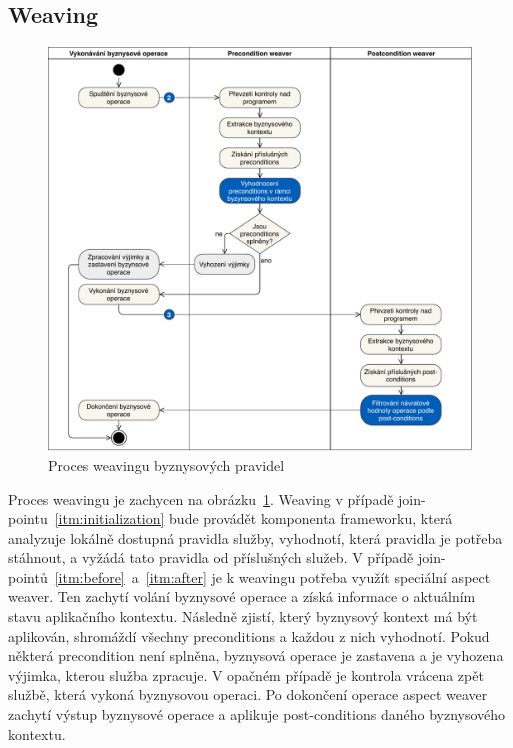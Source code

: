 \subsection{Weaving}

\begin{figure}
    \centering
    \includegraphics[keepaspectratio=true, width=0.9\linewidth]{figures/business-rules-weaver.pdf}
    \caption{Proces weavingu byznysov\'ych pravidel}
    \label{fig:business-rules-weaver}
\end{figure}

Proces weavingu je zachycen na obrázku~\ref{fig:business-rules-weaver}. Weaving v případě
join-pointu~\ref{itm:initialization} bude provádět komponenta frameworku, která
analyzuje lokálně dostupná pravidla služby, vyhodnotí, která pravidla je potřeba stáhnout,
a vyžádá tato pravidla od příslušných služeb. V případě join-pointů~\ref{itm:before}~a~\ref{itm:after}
je k weavingu potřeba využít speciální aspect weaver. Ten zachytí volání byznysové operace a získá
informace o aktuálním stavu aplikačního kontextu. Následně zjistí, který byznysový kontext má být aplikován,
shromáždí všechny preconditions a každou z nich vyhodnotí. Pokud některá precondition není splněna, byznysová
operace je zastavena a je vyhozena výjimka, kterou služba zpracuje. V opačném případě je kontrola vrácena zpět
službě, která vykoná byznysovou operaci. Po dokončení operace aspect weaver zachytí výstup byznysové
operace a aplikuje post-conditions daného byznysového kontextu.

